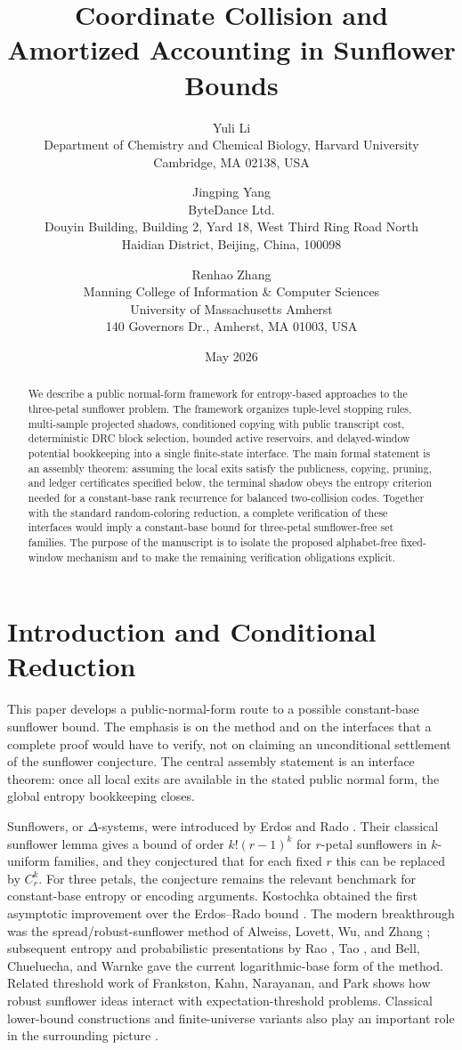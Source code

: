 \documentclass[11pt]{article}
\title{Coordinate Collision and Amortized Accounting in Sunflower Bounds}
\author{
Yuli Li\\
Department of Chemistry and Chemical Biology, Harvard University\\
Cambridge, MA 02138, USA
\and
Jingping Yang\\
ByteDance Ltd.\\
Douyin Building, Building 2, Yard 18, West Third Ring Road North\\
Haidian District, Beijing, China, 100098
\and
Renhao Zhang\\
Manning College of Information \& Computer Sciences\\
University of Massachusetts Amherst\\
140 Governors Dr., Amherst, MA 01003, USA
}
\date{May 2026}
\begin{document}
\maketitle

\begin{abstract}
We describe a public normal-form framework for entropy-based approaches to the
three-petal sunflower problem.  The framework organizes tuple-level stopping
rules, multi-sample projected shadows, conditioned copying with public
transcript cost, deterministic DRC block selection, bounded active reservoirs,
and delayed-window potential bookkeeping into a single finite-state interface.
The main formal statement is an assembly theorem: assuming the local exits
satisfy the publicness, copying, pruning, and ledger certificates specified
below, the terminal shadow obeys the entropy criterion needed for a
constant-base rank recurrence for balanced two-collision codes.  Together with
the standard random-coloring reduction, a complete verification of these
interfaces would imply a constant-base bound for three-petal sunflower-free set
families.  The purpose of the manuscript is to isolate the proposed
alphabet-free fixed-window mechanism and to make the remaining verification
obligations explicit.
\end{abstract}

\tableofcontents

\section{Introduction and Conditional Reduction}

This paper develops a public-normal-form route to a possible constant-base
sunflower bound.  The emphasis is on the method and on the interfaces that a
complete proof would have to verify, not on claiming an unconditional
settlement of the sunflower conjecture.  The central assembly statement is an
interface theorem: once all local exits are available in the stated public
normal form, the global entropy bookkeeping closes.

Sunflowers, or $\Delta$-systems, were introduced by Erdos and Rado
\cite{ER60}.  Their classical sunflower lemma gives a bound of order
$k!(r-1)^k$ for $r$-petal sunflowers in $k$-uniform families, and they
conjectured that for each fixed $r$ this can be replaced by $C_r^k$.  For
three petals, the conjecture remains the relevant benchmark for constant-base
entropy or encoding arguments.  Kostochka obtained the first asymptotic
improvement over the Erdos--Rado bound \cite{Kostochka99}.  The modern
breakthrough was the spread/robust-sunflower method of Alweiss, Lovett, Wu,
and Zhang \cite{ALWZ21}; subsequent entropy and probabilistic presentations by
Rao \cite{Rao20}, Tao \cite{Tao20}, and Bell, Chueluecha, and Warnke
\cite{BCW21} gave the current logarithmic-base form of the method.  Related
threshold work of Frankston, Kahn, Narayanan, and Park \cite{FKNP21} shows how
robust sunflower ideas interact with expectation-threshold problems.
Classical lower-bound constructions and finite-universe variants also play an
important role in the surrounding picture \cite{AHS72,ES78}.
\end{document}
